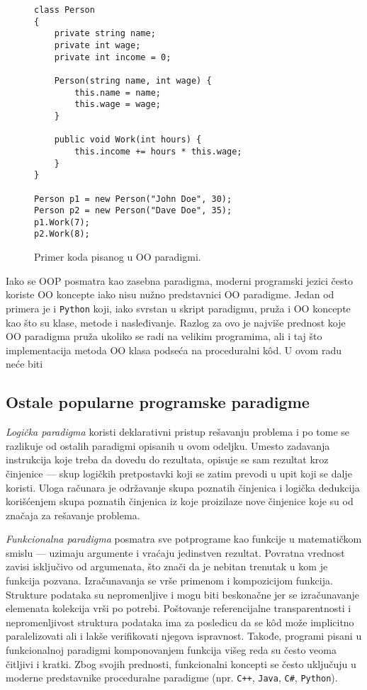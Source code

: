 \begin{figure}[h!]
\begin{lstlisting}
class Person
{
    private string name;
    private int wage;
    private int income = 0;

    Person(string name, int wage) {
        this.name = name;
        this.wage = wage;
    }

    public void Work(int hours) {
        this.income += hours * this.wage;
    }
}

Person p1 = new Person("John Doe", 30);
Person p2 = new Person("Dave Doe", 35);
p1.Work(7);
p2.Work(8);
\end{lstlisting}
\caption{Primer koda pisanog u OO paradigmi.}
\label{fig:ParadigmOO}
\end{figure}

Iako se OOP posmatra kao zasebna paradigma, moderni programski jezici često koriste OO koncepte iako nisu nužno predstavnici OO paradigme. Jedan od primera je i \texttt{Python} koji, iako svrstan u skript paradigmu, pruža i OO koncepte kao što su klase, metode i nasleđivanje. Razlog za ovo je najviše prednost koje OO paradigma pruža ukoliko se radi na velikim programima, ali i taj što implementacija metoda OO klasa podseća na proceduralni k\^od. U ovom radu neće biti 

\subsection{Ostale popularne programske paradigme}
\label{subsec:ParadigmsOther}

\emph{Logička paradigma} koristi deklarativni pristup rešavanju problema i po tome se razlikuje od ostalih paradigmi opisanih u ovom odeljku. Umesto zadavanja instrukcija koje treba da dovedu do rezultata, opisuje se sam rezultat kroz činjenice --- skup logičkih pretpostavki koji se zatim prevodi u upit koji se dalje koristi. Uloga računara je održavanje skupa poznatih činjenica i logička dedukcija korišćenjem skupa poznatih činjenica iz koje proizilaze nove činjenice koje su od značaja za rešavanje problema. 

\emph{Funkcionalna paradigma} posmatra sve potprograme kao funkcije u matematičkom smislu --- uzimaju argumente i vraćaju jedinstven rezultat. Povratna vrednost zavisi isključivo od argumenata, što znači da je nebitan trenutak u kom je funkcija pozvana. Izračunavanja se vrše primenom i kompozicijom funkcija. Strukture podataka su nepromenljive i mogu biti beskonačne jer se izračunavanje elemenata kolekcija vrši po potrebi. Poštovanje referencijalne transparentnosti i nepromenljivost struktura podataka ima za posledicu da se k\^od može implicitno paralelizovati ali i lakše verifikovati njegova ispravnost. Takođe, programi pisani u funkcionalnoj paradigmi komponovanjem funkcija višeg reda su često veoma čitljivi i kratki. Zbog svojih prednosti, funkcionalni koncepti se često uključuju u moderne predstavnike proceduralne paradigme (npr. \texttt{C++}, \texttt{Java}, \texttt{C\#}, \texttt{Python}).
